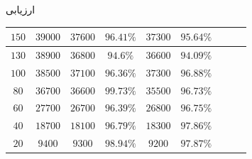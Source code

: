 \documentclass{beamer}
\begin{document}
\begin{persian}
\begin{frame}{ارزیابی}
\begin{table}[h]
\begin{tabularx}{\textwidth}{ccccccccc}
            \midrule
            \(150\) &
            \(39000\) &
            \(37600\) &
            \(96.41\%\) &
            \(37300\) &
            \(95.64\%\) \\
            \midrule
            \(130\) &
            \(38900\) &
            \(36800\) &
            \(94.6\%\) &
            \(36600\) &
            \(94.09\%\) \\
            \midrule
            \(100\) &
            \(38500\) &
            \(37100\) &
            \(96.36\%\) &
            \(37300\) &
            \(96.88\%\) \\
            \midrule
            \(80\) &
            \(36700\) &
            \(36600\) &
            \(99.73\%\) &
            \(35500\) &
            \(96.73\%\) \\
            \midrule
            \(60\) &
            \(27700\) &
            \(26700\) &
            \(96.39\%\) &
            \(26800\) &
            \(96.75\%\) \\
            \midrule
            \(40\) &
            \(18700\) &
            \(18100\) &
            \(96.79\%\) &
            \(18300\) &
            \(97.86\%\) \\
            \midrule
            \(20\) &
            \(9400\) &
            \(9300\) &
            \(98.94\%\) &
            \(9200\) &
            \(97.87\%\) \\
            \bottomrule
        \end{tabularx}
    \end{table}
\end{frame}
\end{persian}
\end{document}
